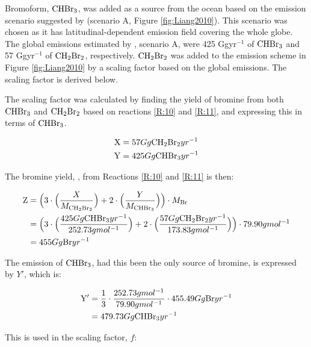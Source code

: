 \medskip

Bromoform, $\mathrm{CHBr_3}$, was added as a source from the ocean based on the emission scenario suggested by \cite{Liang2010} (scenario A, Figure \ref{fig:Liang2010}). This scenario was chosen as it has latitudinal-dependent emission field covering the whole globe. The global emissions estimated by \cite{Liang2010}, scenario A, were 425 Ggyr$^{-1}$ of $\mathrm{CHBr_3}$ and 57 Ggyr$^{-1}$ of $\mathrm{CH_2Br_2}$, respectively. $\mathrm{CH_2Br_2}$ was added to the emission scheme in Figure \ref{fig:Liang2010} by a scaling factor based on the global emissions. The scaling factor is derived below.


\medskip

The scaling factor was calculated by finding the yield of bromine from both $\mathrm{CHBr_3}$ and $\mathrm{CH_2Br_2}$ based on reactions \ref{R:10} and \ref{R:11}, and expressing this in terms of $\mathrm{CHBr_3}$. 

\begin{align*}
    \mathrm{X} & = 57 Gg \mathrm{CH_2Br_2}yr^{-1} \\
    \mathrm{Y} & = 425 Gg \mathrm{CHBr_3}yr^{-1} 
\end{align*}

The bromine yield, , from Reactions \ref{R:10} and \ref{R:11} is then: 

\begin{align*}
    \mathrm{Z} & = \Big(3\cdot\Big(\frac{X}{M_{\mathrm{CH_2Br_2}}}\Big) + 2\cdot\Big(\frac{Y}{M_{\mathrm{CHBr_3}}}\Big)\Big)\cdot M_{\mathrm{Br}} \\
    & = \Big(3\cdot\Big(\frac{425 Gg \mathrm{CHBr_3}yr^{-1}}{252.73 g mol^{-1}}\Big) + 2\cdot\Big(\frac{57 Gg \mathrm{CH_2Br_2}yr^{-1}}{173.83 g mol^{-1}}\Big)\Big)\cdot79.90 g mol^{-1} \\
    & = 455 Gg\mathrm{Br}yr^{-1}
\end{align*}

The emission of $\mathrm{CHBr_3}$, had this been the only source of bromine, is expressed by $Y'$, which is: 

\begin{align*}
    \mathrm{Y'} & = \frac{1}{3}\cdot\frac{252.73 g mol^{-1}}{79.90 g mol^{-1}}\cdot455.49Gg\mathrm{Br}yr^{-1} \\
    & = 479.73 Gg \mathrm{CHBr_3}yr^{-1}
\end{align*}

This is used in the scaling factor, $f$:

